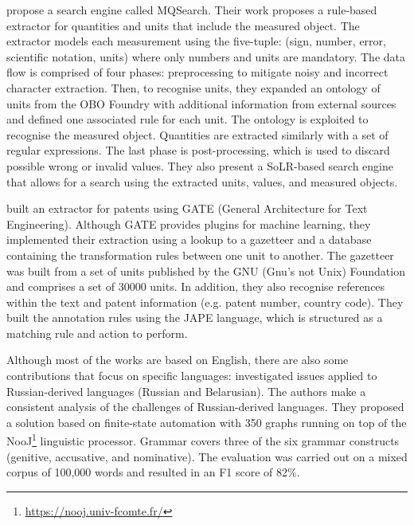\cite{maiya2015mining} propose a search engine called MQSearch. Their work proposes a rule-based extractor for quantities and units that include the measured object. The extractor models each measurement using the five-tuple: (sign, number, error, scientific notation, units) where only numbers and units are mandatory. 
The data flow is comprised of four phases: preprocessing to mitigate noisy and incorrect character extraction. 
Then, to recognise units, they expanded an ontology of units from the OBO Foundry with additional information from external sources and defined one associated rule for each unit. The ontology is exploited to recognise the measured object. 
Quantities are extracted similarly with a set of regular expressions. 
The last phase is post-processing, which is used to discard possible wrong or invalid values. 
They also present a SoLR-based search engine that allows for a search using the extracted units, values, and measured objects. 

\cite{agatonovic2008large} built an extractor for patents using GATE (General Architecture for Text Engineering). 
Although GATE provides plugins for machine learning, they implemented their extraction using a lookup to a gazetteer and a database containing the transformation rules between one unit to another. 
The gazetteer was built from a set of units published by the GNU (Gnu's not Unix) Foundation and comprises a set of 30000 units. In addition, they also recognise references within the text and patent information (e.g. patent number, country code). 
They built the annotation rules using the JAPE language, which is structured as a matching rule and action to perform. 

Although most of the works are based on English, there are also some contributions that focus on specific languages: \cite{hetsevich2014processing} investigated issues applied to Russian-derived languages (Russian and Belarusian). 
The authors make a consistent analysis of the challenges of Russian-derived languages. 
They proposed a solution based on finite-state automation with 350 graphs running on top of the NooJ\footnote{\url{https://nooj.univ-fcomte.fr/}} linguistic processor. 
Grammar covers three of the six grammar constructs (genitive, accusative, and nominative). 
The evaluation was carried out on a mixed corpus of 100,000 words and resulted in an F1 score of 82\%. 

